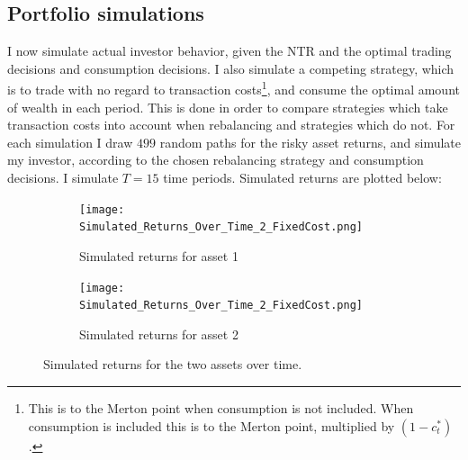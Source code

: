 \documentclass[11pt]{article}
\begin{document}
\subsection{Portfolio simulations} \label{Subsection: Portfolio_Simulations}
I now simulate actual investor behavior, given the \ac{NTR} and the optimal trading decisions and consumption decisions.
I also simulate a competing strategy, which is to trade with no regard to transaction costs\footnote{This is to the Merton point when consumption is not included. 
When consumption is included this is to the Merton point, multiplied by $(1-c^{*}_{t})$.}, and consume the optimal amount of wealth in each period.
This is done in order to compare strategies which take transaction costs into account when rebalancing and strategies which do not.
For each simulation I draw $499$ random paths for the risky asset returns, and simulate my investor, according to the chosen rebalancing strategy and consumption decisions.
I simulate $T=15$ time periods. Simulated returns are plotted below:
\begin{figure}[!ht]
    \centering
    \begin{subfigure}[t]{0.49\textwidth}
        \centering
        \texttt{[image: Simulated\_Returns\_Over\_Time\_2\_FixedCost.png]}
        \caption{Simulated returns for asset 1}
    \end{subfigure}%
    \hfill
    \begin{subfigure}[t]{0.49\textwidth}
        \centering
        \texttt{[image: Simulated\_Returns\_Over\_Time\_2\_FixedCost.png]}
        \caption{Simulated returns for asset 2}
    \end{subfigure}
\caption{Simulated returns for the two assets over time.}
\end{figure}
\FloatBarrier %
\end{document}

